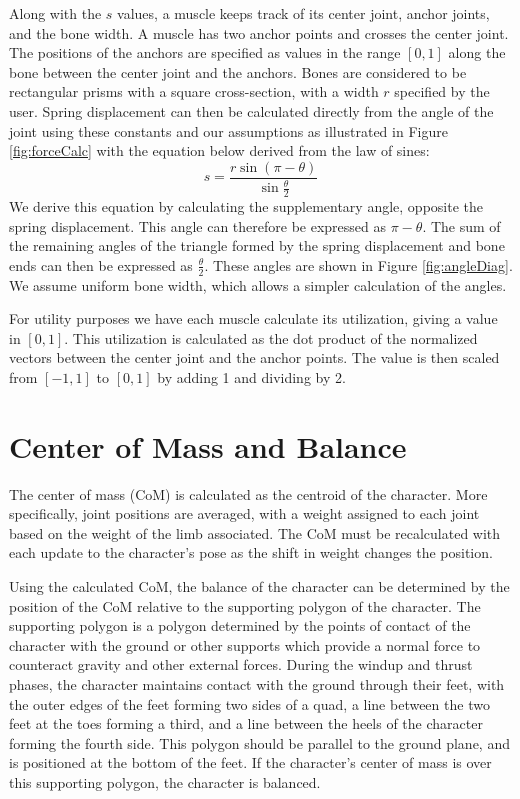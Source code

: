Along with the $s$ values, a muscle keeps track of its center joint, anchor joints, and the bone width.  A muscle has two anchor points and crosses the center joint.  The positions of the anchors are specified as values in the range $[0,1]$ along the bone between the center joint and the anchors.  Bones are considered to be rectangular prisms with a square cross-section, with a width $r$ specified by the user.  Spring displacement can then be calculated directly from the angle of the joint using these constants and our assumptions as illustrated in Figure \ref{fig:forceCalc} with the equation below derived from the law of sines:
\[ 
	s = \dfrac{r\sin\left(\pi - \theta \right)}{\sin\frac{\theta}{2}}
\]
We derive this equation by calculating the supplementary angle, opposite the spring displacement.  This angle can therefore be expressed as $\pi - \theta$. The sum of the remaining angles of the triangle formed by the spring displacement and bone ends can then be expressed as $\frac{\theta}{2}$.  These angles are shown in Figure \ref{fig:angleDiag}. We assume uniform bone width, which allows a simpler calculation of the angles.

\begin{table}[ht]
	\centering
	
	\caption[Table of estimated forces given $k$ values and times]{}
	\label{tab:force_est}
\end{table}

For utility purposes we have each muscle calculate its utilization, giving a value in $[0,1]$.  This utilization is calculated as the dot product of the normalized vectors between the center joint and the anchor points.  The value is then scaled from $[-1, 1]$ to $[0,1]$ by adding 1 and dividing by 2.

\section{Center of Mass and Balance}
\label{section:com}
The center of mass (CoM) is calculated as the centroid of the character.  More specifically, joint positions are averaged, with a weight assigned to each joint based on the weight of the limb associated.  The CoM must be recalculated with each update to the character's pose as the shift in weight changes the position.

Using the calculated CoM, the balance of the character can be determined by the position of the CoM relative to the supporting polygon of the character.  The supporting polygon is a polygon determined by the points of contact of the character with the ground or other supports which provide a normal force to counteract gravity and other external forces.  During the windup and thrust phases, the character maintains contact with the ground through their feet, with the outer edges of the feet forming two sides of a quad, a line between the two feet at the toes forming a third, and a line between the heels of the character forming the fourth side.  This polygon should be parallel to the ground plane, and is positioned at the bottom of the feet.  If the character's center of mass is over this supporting polygon, the character is balanced.

